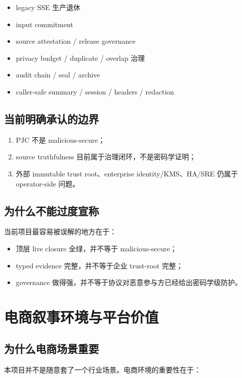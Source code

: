 \documentclass[UTF8,a4paper,12pt,oneside]{ctexrep}
\begin{document}
\begin{itemize}
  \item legacy SSE 生产退休
  \item input commitment
  \item source attestation / release governance
  \item privacy budget / duplicate / overlap 治理
  \item audit chain / seal / archive
  \item caller-safe summary / session / headers / redaction
\end{itemize}

\section{当前明确承认的边界}

\begin{enumerate}
  \item PJC 不是 malicious-secure；
  \item source truthfulness 目前属于治理闭环，不是密码学证明；
  \item 外部 immutable trust root、enterprise identity/KMS、HA/SRE 仍属于 operator-side 问题。
\end{enumerate}

\section{为什么不能过度宣称}

当前项目最容易被误解的地方在于：

\begin{itemize}
  \item 顶层 live closure 全绿，并不等于 malicious-secure；
  \item typed evidence 完整，并不等于企业 trust-root 完整；
  \item governance 做得强，并不等于协议对恶意参与方已经给出密码学级防护。
\end{itemize}

\chapter{电商叙事环境与平台价值}

\section{为什么电商场景重要}

本项目并不是随意套了一个行业场景。电商环境的重要性在于：
\end{document}

